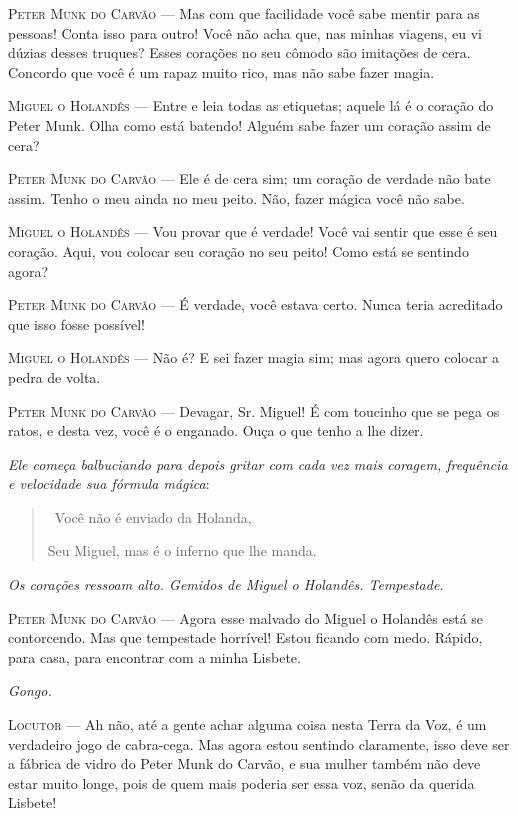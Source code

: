 \textsc{Peter Munk do Carvão} --- Mas com que facilidade você sabe mentir para as
pessoas! Conta isso para outro! Você não acha que, nas minhas viagens,
eu vi dúzias desses truques? Esses corações no seu cômodo são imitações
de cera. Concordo que você é um rapaz muito rico, mas não sabe fazer
magia.

\textsc{Miguel o Holandês} --- Entre e leia todas as etiquetas; aquele lá é o
coração do Peter Munk. Olha como está batendo! Alguém sabe fazer um
coração assim de cera?

\textsc{Peter Munk do Carvão} --- Ele é de cera sim; um coração de verdade não
bate assim. Tenho o meu ainda no meu peito. Não, fazer mágica você não
sabe.

\textsc{Miguel o Holandês} --- Vou provar que é verdade! Você vai sentir que esse
é seu coração. Aqui, vou colocar seu coração no seu peito! Como está se
sentindo agora?

\textsc{Peter Munk do Carvão} --- É verdade, você estava certo. Nunca teria
acreditado que isso fosse possível!

\textsc{Miguel o Holandês} --- Não é? E sei fazer magia sim; mas agora quero
colocar a pedra de volta.

\textsc{Peter Munk do Carvão} --- Devagar, Sr. Miguel! É com toucinho que se pega
os ratos, e desta vez, você é o enganado. Ouça o que tenho a lhe dizer.

\emph{Ele começa balbuciando para depois gritar com cada vez mais
coragem, frequência e velocidade sua fórmula mágica}:

\begin{quote}
\quad \, Você não é enviado da Holanda,

Seu Miguel, mas é o inferno que lhe manda.
\end{quote}

\emph{Os corações ressoam alto. Gemidos de Miguel o Holandês.
Tempestade.}

\textsc{Peter Munk do Carvão} --- Agora esse malvado do Miguel o Holandês está se
contorcendo. Mas que tempestade horrível! Estou ficando com medo.
Rápido, para casa, para encontrar com a minha Lisbete.

\emph{Gongo.}

\textsc{Locutor} --- Ah não, até a gente achar alguma coisa nesta Terra da Voz, é
um verdadeiro jogo de cabra-cega. Mas agora estou sentindo claramente,
isso deve ser a fábrica de vidro do Peter Munk do Carvão, e sua mulher
também não deve estar muito longe, pois de quem mais poderia ser essa
voz, senão da querida Lisbete!

